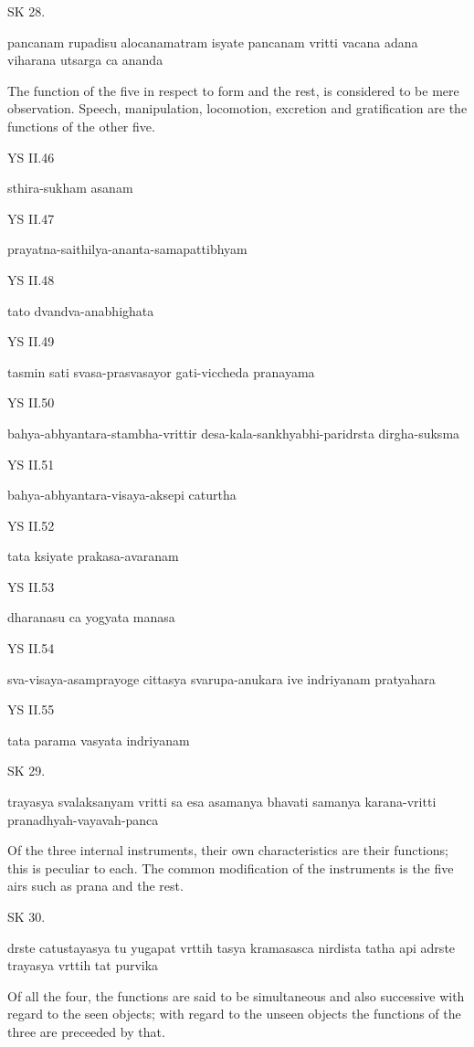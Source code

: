 SK 28.

pancanam rupadisu alocanamatram isyate
pancanam vritti vacana adana viharana utsarga ca ananda

The function of the five in respect to form and the rest,
is considered to be mere observation.
Speech, manipulation, locomotion, excretion and gratification
are the functions of the other five.

YS II.46

    sthira-sukham asanam
    
YS II.47

    prayatna-saithilya-ananta-samapattibhyam

YS II.48
    
    tato dvandva-anabhighata

YS II.49

    tasmin sati svasa-prasvasayor gati-viccheda pranayama

YS II.50

    bahya-abhyantara-stambha-vrittir desa-kala-sankhyabhi-paridrsta dirgha-suksma

YS II.51

    bahya-abhyantara-visaya-aksepi caturtha

YS II.52
   
    tata ksiyate prakasa-avaranam

YS II.53
   
    dharanasu ca yogyata manasa

YS II.54
   
    sva-visaya-asamprayoge cittasya svarupa-anukara ive indriyanam pratyahara

YS II.55

    tata parama vasyata indriyanam

SK 29.

trayasya svalaksanyam vritti sa esa asamanya bhavati
samanya karana-vritti pranadhyah-vayavah-panca

Of the three internal instruments, their own characteristics are their functions;
this is peculiar to each.
The common modification of the instruments is the five airs
such as prana and the rest.

SK 30.

drste catustayasya tu yugapat vrttih tasya kramasasca nirdista
tatha api adrste trayasya vrttih tat purvika

Of all the four, the functions are said to be simultaneous and also successive
with regard to the seen objects;
with regard to the unseen objects
the functions of the three are preceeded by that.

